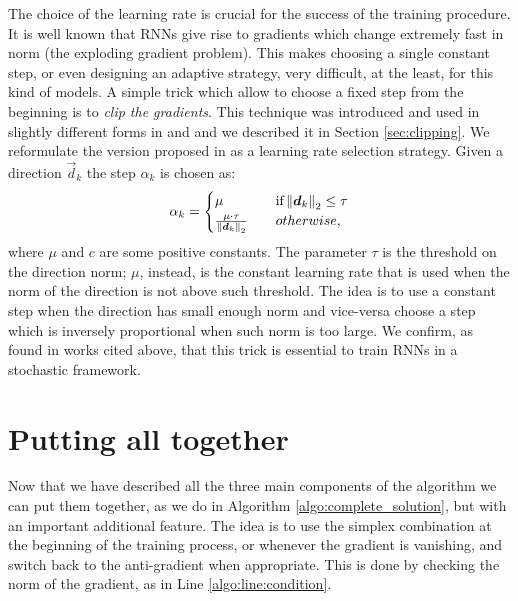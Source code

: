 The choice of the learning rate is crucial for the success of the training procedure. It is well known that RNNs give rise to gradients which change extremely fast in norm (the exploding gradient problem). This makes choosing a single constant step, or even designing an adaptive strategy, very difficult, at the least, for this kind of models. A simple trick which allow to choose a fixed step from the beginning is to \textit{clip the gradients}. This technique was introduced and used in slightly different forms in \cite{understandingExplodingGradients} and \cite{clippingMikolov} and we described it in Section \ref{sec:clipping}. We reformulate the version proposed in \cite{understandingExplodingGradients} as a learning rate selection strategy.
Given a direction $\vec{d}_k$ the step $\alpha_k$ is chosen as:
\begin{equation}
\alpha_k = 
\begin{cases}
	\mu  \quad &\mbox{if} \left\Vert \boldsymbol{d}_k \right\Vert_2 \leq \tau\\
	\frac{\mu \cdot \tau}{\left\Vert \boldsymbol{d}_k \right\Vert_2} \quad & otherwise,
\end{cases}
\end{equation}
where $\mu$ and $c$ are some positive constants. The parameter $\tau$ is the threshold on the direction norm; $\mu$, instead, is the constant learning rate that is used when the norm of the direction is not above such threshold. The idea is to use a constant step when the direction has small enough norm and vice-versa choose a step which is inversely proportional when such norm is too large. We confirm, as found in works cited above, that this trick is essential to train RNNs in a stochastic framework.

\section{Putting all together}
Now that we have described all the three main components of the algorithm we can put them together, as we do in Algorithm \ref{algo:complete_solution}, but with an important additional feature. The idea is to use the simplex combination at the beginning of the training process, or whenever the gradient is vanishing, and switch back to the anti-gradient when appropriate. This is done by checking the norm of the gradient, as in Line \ref{algo:line:condition}.



